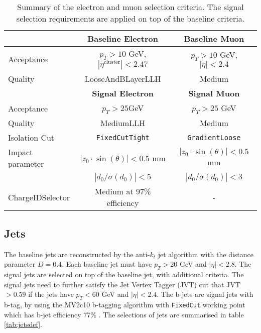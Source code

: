\begin{table}[htbp]
\begin{center}
\begin{tabular}{|l|c|c|}
\hline
& \textbf{Baseline Electron} & \textbf{Baseline Muon} \\
\hline
\hline
Acceptance     & $p_T > 10$ GeV, $|\eta^{\text{cluster}}| < 2.47$  & $p_T > 10$ GeV, $|\eta| < 2.4$ \\
\hline
Quality & LooseAndBLayerLLH & Medium \\
\hline
\hline
& \textbf{Signal Electron} & \textbf{Signal Muon} \\
\hline
\hline
Acceptance & $p_T > 25$GeV & $p_T > 25$ GeV \\
\hline
Quality & MediumLLH & Medium \\
\hline
Isolation Cut  & \texttt{FixedCutTight} & \texttt{GradientLoose} \\
\hline
Impact parameter & $|z_0 \cdot \sin (\theta)|< 0.5$ mm   & $|z_0 \cdot \sin (\theta)|< 0.5$ mm \\
& $|d_0/\sigma(d_0)|<5$ & $|d_0/\sigma(d_0)| < 3$\\
\hline
ChargeIDSelector & Medium at 97\% efficiency & - \\
\hline
\end{tabular}
\end{center}
\caption{Summary of the electron and muon selection criteria. The signal selection requirements are applied on top of the baseline criteria.}
\label{tab:lepdef}
\end{table}

\subsection{Jets}
The baseline jets are reconstructed by the anti-$k_t$ jet algorithm \cite{anti_kt} with the distance parameter $D = 0.4$.
Each baseline jet must have $p_T > 20$ GeV and $|\eta| < 2.8$.
The signal jets are selected on top of the baseline jet, with additional criteria.
The signal jets need to further satisfy the Jet Vertex Tagger (JVT) cut \cite{jvt} that JVT$> 0.59$ if the jets have $p_T < 60$ GeV and $|\eta| < 2.4$.
The b-jets are signal jets with b-tag, by using the MV2c10 b-tagging algorithm with \texttt{FixedCut} working point which has b-jet efficiency 77\% \cite{btag}.
The selections of jets are summarised in table \ref{tab:jetsdef}.

